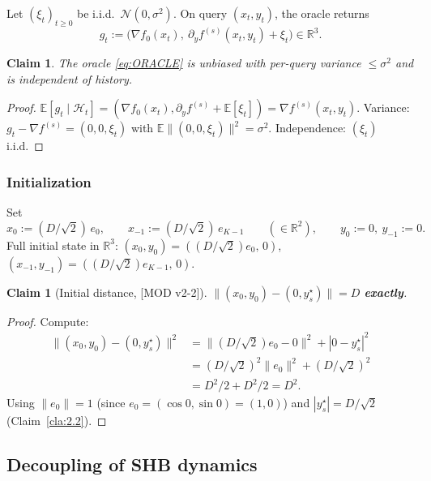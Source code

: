 \documentclass[11pt,a4paper]{article}
\theoremstyle{plain}
\newtheorem{claim}[theorem]{Claim}
\theoremstyle{definition}
\theoremstyle{remark}
\newcommand{\R}{\mathbb{R}}
\newcommand{\E}{\mathbb{E}}
\begin{document}
Let $(\xi_t)_{t\geq 0}$ be i.i.d.\ $\mathcal{N}(0, \sigma^2)$. On query $(x_t, y_t)$, the oracle returns
\begin{equation}
g_t := \big(\nabla f_0(x_t),\ \partial_y f^{(s)}(x_t, y_t) + \xi_t\big) \in \R^3.\tag{ORACLE}\label{eq:ORACLE}
\end{equation}

\begin{claim}
\label{cla:2.3}
The oracle \eqref{eq:ORACLE} is unbiased with per-query variance $\leq \sigma^2$ and is independent of history.
\end{claim}

\begin{proof}
$\E[g_t \mid \mathcal{H}_t] = (\nabla f_0(x_t), \partial_y f^{(s)} + \E[\xi_t]) = \nabla f^{(s)}(x_t, y_t)$. Variance: $g_t - \nabla f^{(s)} = (0, 0, \xi_t)$ with $\E\|(0,0,\xi_t)\|^2 = \sigma^2$. Independence: $(\xi_t)$ i.i.d.
\end{proof}

\subsubsection{Initialization}

Set
\[
x_0 := (D/\sqrt 2)\,e_0,\qquad x_{-1} := (D/\sqrt 2)\, e_{K-1}\qquad (\in \R^2),\qquad y_0 := 0,\ y_{-1} := 0.
\]
Full initial state in $\R^3$: $(x_0, y_0) = ((D/\sqrt 2) e_0,\, 0)$, $(x_{-1}, y_{-1}) = ((D/\sqrt 2) e_{K-1},\, 0)$.

\begin{claim}[Initial distance, {[MOD v2-2]}]
\label{cla:2.4}
$\|(x_0, y_0) - (0, y^\star_s)\| = D$ \textbf{exactly}.
\end{claim}

\begin{proof}
Compute:
\begin{align*}
\|(x_0, y_0) - (0, y^\star_s)\|^2
&= \|(D/\sqrt 2) e_0 - 0\|^2 + |0 - y^\star_s|^2 \\
&= (D/\sqrt 2)^2 \|e_0\|^2 + (D/\sqrt 2)^2 \\
&= D^2/2 + D^2/2 = D^2.
\end{align*}
Using $\|e_0\| = 1$ (since $e_0 = (\cos 0, \sin 0) = (1, 0)$) and $|y^\star_s| = D/\sqrt 2$ (Claim~\ref{cla:2.2}).
\end{proof}

\subsection{Decoupling of SHB dynamics}
\end{document}
